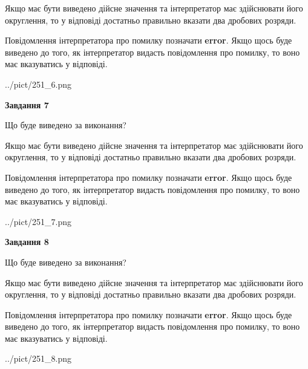 \documentclass[12pt, ukrainian]{article}
\begin{document}
{\begin {Large}
Якщо має бути виведено дійсне значення та інтерпретатор має здійснювати його округлення, 
то у відповіді достатньо правильно вказати два дробових розряди.

Повідомлення інтерпретатора про помилку позначати \textbf{error}.
Якщо щось буде виведено до того, як інтерпретатор видасть повідомлення про помилку, 
то воно має вказуватись у відповіді. \par

\begin{center}
	{../pict/251_6.png}
\end{center}
\newpage

{\begin {center}\textbf{Завдання 7}\end {center}}\par
Що буде виведено за виконання? \par

Якщо має бути виведено дійсне значення та інтерпретатор має здійснювати його округлення, 
то у відповіді достатньо правильно вказати два дробових розряди.

Повідомлення інтерпретатора про помилку позначати \textbf{error}.
Якщо щось буде виведено до того, як інтерпретатор видасть повідомлення про помилку, 
то воно має вказуватись у відповіді. \par

\begin{center}
	{../pict/251_7.png}
\end{center}
\newpage

{\begin {center}\textbf{Завдання 8}\end {center}}\par
Що буде виведено за виконання? \par

Якщо має бути виведено дійсне значення та інтерпретатор має здійснювати його округлення, 
то у відповіді достатньо правильно вказати два дробових розряди.

Повідомлення інтерпретатора про помилку позначати \textbf{error}.
Якщо щось буде виведено до того, як інтерпретатор видасть повідомлення про помилку, 
то воно має вказуватись у відповіді. \par

\begin{center}
	{../pict/251_8.png}
\end{center}
\newpage


\end{Large}}
\end{document}
